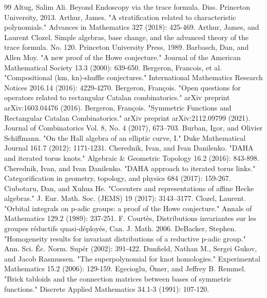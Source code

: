 \documentclass{amsart}
\numberwithin{equation}{section}
\theoremstyle{definition}
\begin{document}
\begin{thebibliography}{99}
 Altug, Salim Ali. Beyond Endoscopy via the trace formula. Diss. Princeton University, 2013.
 Arthur, James. "A stratification related to characteristic polynomials." Advances in Mathematics 327 (2018): 425-469.
 Arthur, James, and Laurent Clozel. Simple algebras, base change, and the advanced theory of the trace formula. No. 120. Princeton University Press, 1989.
 Barbasch, Dan, and Allen Moy. "A new proof of the Howe conjecture." Journal of the American Mathematical Society 13.3 (2000): 639-650.
 Bergeron, Francois, et al. "Compositional (km, kn)-shuffle conjectures." International Mathematics Research Notices 2016.14 (2016): 4229-4270.
 Bergeron, François. "Open questions for operators related to rectangular Catalan combinatorics." arXiv preprint arXiv:1603.04476 (2016).
 Bergeron, François. "Symmetric Functions and Rectangular Catalan Combinatorics." arXiv preprint arXiv:2112.09799 (2021).
Journal of Combinatorics Vol. 8, No. 4 (2017), 673–703.
 Burban, Igor, and Olivier Schiffmann. "On the Hall algebra of an elliptic curve, I." Duke Mathematical Journal 161.7 (2012): 1171-1231.
 Cherednik, Ivan, and Ivan Danilenko. "DAHA and iterated torus knots." Algebraic \& Geometric Topology 16.2 (2016): 843-898.
 Cherednik, Ivan, and Ivan Danilenko. "DAHA approach to iterated torus links." Categorification in geometry, topology, and physics 684 (2017): 159-267.
 Ciubotaru, Dan, and Xuhua He. "Cocenters and representations of affine {H}ecke algebras." J. Eur. Math. Soc. (JEMS) 19 (2017): 3143--3177.
 Clozel, Laurent. "Orbital integrals on p-adic groups: a proof of the Howe conjecture." Annals of Mathematics 129.2 (1989): 237-251.
 F. Court\`{e}s, Distributions invariantes sur les groupes r\'{e}ductifs quasi-d\'{e}ploy\'{e}s, Can. J. Math. 2006.
 DeBacker, Stephen. "Homogeneity results for invariant distributions of a reductive p-adic group." Ann. Sci. \'{E}c. Norm. Sup\'{e}r (2002): 391-422.
 Dunfield, Nathan M., Sergei Gukov, and Jacob Rasmussen. "The superpolynomial for knot homologies." Experimental Mathematics 15.2 (2006): 129-159.
 Egecioglu, Ömer, and Jeffrey B. Remmel. "Brick tabloids and the connection matrices between bases of symmetric functions." Discrete Applied Mathematics 34.1-3 (1991): 107-120.

\end{thebibliography}
\end{document}
